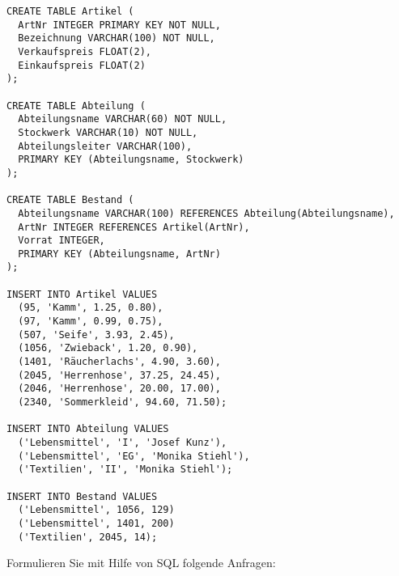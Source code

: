 \documentclass{lehramt-informatik-aufgabe}
\begin{document}
\begin{verbatim}
CREATE TABLE Artikel (
  ArtNr INTEGER PRIMARY KEY NOT NULL,
  Bezeichnung VARCHAR(100) NOT NULL,
  Verkaufspreis FLOAT(2),
  Einkaufspreis FLOAT(2)
);

CREATE TABLE Abteilung (
  Abteilungsname VARCHAR(60) NOT NULL,
  Stockwerk VARCHAR(10) NOT NULL,
  Abteilungsleiter VARCHAR(100),
  PRIMARY KEY (Abteilungsname, Stockwerk)
);

CREATE TABLE Bestand (
  Abteilungsname VARCHAR(100) REFERENCES Abteilung(Abteilungsname),
  ArtNr INTEGER REFERENCES Artikel(ArtNr),
  Vorrat INTEGER,
  PRIMARY KEY (Abteilungsname, ArtNr)
);

INSERT INTO Artikel VALUES
  (95, 'Kamm', 1.25, 0.80),
  (97, 'Kamm', 0.99, 0.75),
  (507, 'Seife', 3.93, 2.45),
  (1056, 'Zwieback', 1.20, 0.90),
  (1401, 'Räucherlachs', 4.90, 3.60),
  (2045, 'Herrenhose', 37.25, 24.45),
  (2046, 'Herrenhose', 20.00, 17.00),
  (2340, 'Sommerkleid', 94.60, 71.50);

INSERT INTO Abteilung VALUES
  ('Lebensmittel', 'I', 'Josef Kunz'),
  ('Lebensmittel', 'EG', 'Monika Stiehl'),
  ('Textilien', 'II', 'Monika Stiehl');

INSERT INTO Bestand VALUES
  ('Lebensmittel', 1056, 129)
  ('Lebensmittel', 1401, 200)
  ('Textilien', 2045, 14);
\end{verbatim}

Formulieren Sie mit Hilfe von SQL folgende Anfragen:
\end{document}
